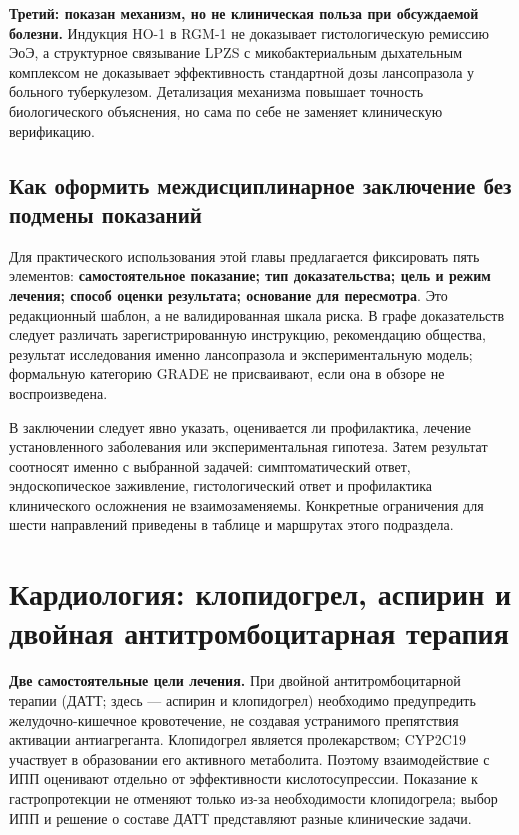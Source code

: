 \documentclass[11pt,a4paper,notitlepage]{report}
\newcommand{\src}[1]{\unskip\space\cite{#1}}
\begin{document}
\textbf{Третий: показан механизм, но не клиническая польза при обсуждаемой болезни.} Индукция HO-1 в RGM-1 не доказывает гистологическую ремиссию ЭоЭ, а структурное связывание LPZS с микобактериальным дыхательным комплексом не доказывает эффективность стандартной дозы лансопразола у больного туберкулезом. Детализация механизма повышает точность биологического объяснения, но сама по себе не заменяет клиническую верификацию.\src{molnrf2,molho1,moltb,moltbstructure}

\subsection{Как оформить междисциплинарное заключение без подмены показаний}
Для практического использования этой главы предлагается фиксировать пять элементов: \textbf{самостоятельное показание; тип доказательства; цель и режим лечения; способ оценки результата; основание для пересмотра}. Это редакционный шаблон, а не валидированная шкала риска. В графе доказательств следует различать зарегистрированную инструкцию, рекомендацию общества, результат исследования именно лансопразола и экспериментальную модель; формальную категорию GRADE не присваивают, если она в обзоре не воспроизведена.

В заключении следует явно указать, оценивается ли профилактика, лечение установленного заболевания или экспериментальная гипотеза. Затем результат соотносят именно с выбранной задачей: симптоматический ответ, эндоскопическое заживление, гистологический ответ и профилактика клинического осложнения не взаимозаменяемы. Конкретные ограничения для шести направлений приведены в таблице и маршрутах этого подраздела.\src{nice,aspirintrial,asthma,eoe,sccm,moltb,moltbstructure}

\section{Кардиология: клопидогрел, аспирин и двойная антитромбоцитарная терапия}
\label{sec:clopidogrel}
\textbf{Две самостоятельные цели лечения.} При двойной антитромбоцитарной терапии (ДАТТ; здесь --- аспирин и клопидогрел) необходимо предупредить желудочно-кишечное кровотечение, не создавая устранимого препятствия активации антиагреганта. Клопидогрел является пролекарством; CYP2C19 участвует в образовании его активного метаболита. Поэтому взаимодействие с ИПП оценивают отдельно от эффективности кислотосупрессии. Показание к гастропротекции не отменяют только из-за необходимости клопидогрела; выбор ИПП и решение о составе ДАТТ представляют разные клинические задачи.\src{cardioplavix2025,cardioesc2023}
\end{document}
